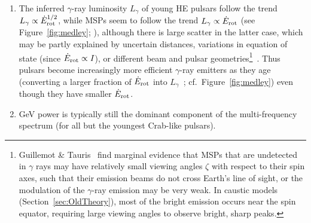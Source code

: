 \documentclass{PoS}
\begin{document}
\begin{enumerate}
  \item The inferred $\gamma$-ray luminosity $L_\gamma$ of young HE pulsars follow the trend $L_\gamma\propto\dot{E}_{\rm rot}^{1/2}$, while MSPs seem to follow the trend $L_\gamma\propto\dot{E}_{\rm rot}$ (see Figure~\ref{fig:medley}; \cite{2PC}), although there is large scatter in the latter case, which may be partly explained by uncertain distances, variations in equation of state (since $\dot{E}_{\rm rot}\propto I$), or different beam and pulsar geometries\footnote{Guillemot \& Tauris~\cite{Guillemot14} find marginal evidence that MSPs that are undetected in $\gamma$ rays may have relatively small viewing angles $\zeta$ with respect to their spin axes, such that their emission beams do not cross Earth's line of sight, or the modulation of the $\gamma$-ray emission may be very weak. In caustic models (Section~\ref{sec:OldTheory}), most of the bright emission occurs near the spin equator, requiring large viewing angles to observe bright, sharp peaks.}~\cite{Guillemot14,Guillemot16,Kalapotharakos17b}. Thus pulsars become increasingly more efficient $\gamma$-ray emitters as they age (converting a larger fraction of $\dot{E}_{\rm rot}$ into $L_\gamma$~\cite{2PC}; cf.\ Figure~\ref{fig:medley}) even though they have smaller $\dot{E}_{\rm rot}$.
  \item GeV power is typically still the dominant component of the multi-frequency spectrum (for all but the youngest Crab-like pulsars).

\end{enumerate}
\end{document}
